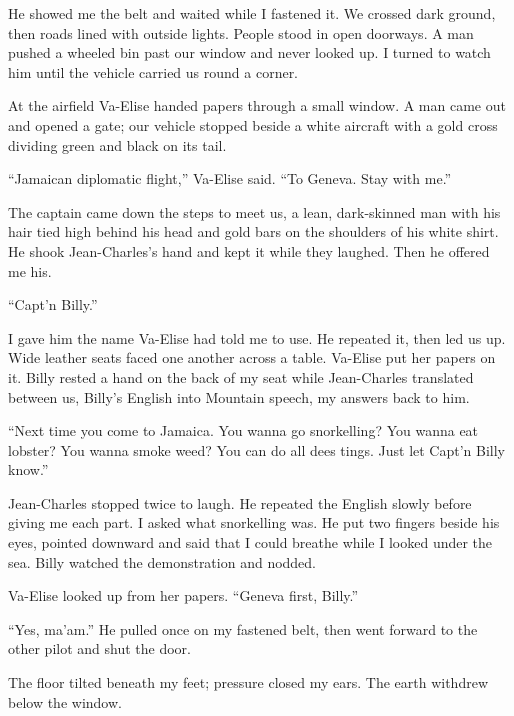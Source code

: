 He showed me the belt and waited while I fastened it. We crossed dark ground, then roads lined with outside lights. People stood in open doorways. A man pushed a wheeled bin past our window and never looked up. I turned to watch him until the vehicle carried us round a corner.\par

At the airfield Va-Elise handed papers through a small window. A man came out and opened a gate; our vehicle stopped beside a white aircraft with a gold cross dividing green and black on its tail.\par

``Jamaican diplomatic flight,'' Va-Elise said. ``To Geneva. Stay with me.''\par

The captain came down the steps to meet us, a lean, dark-skinned man with his hair tied high behind his head and gold bars on the shoulders of his white shirt. He shook Jean-Charles's hand and kept it while they laughed. Then he offered me his.\par

``Capt'n Billy.''\par

I gave him the name Va-Elise had told me to use. He repeated it, then led us up. Wide leather seats faced one another across a table. Va-Elise put her papers on it. Billy rested a hand on the back of my seat while Jean-Charles translated between us, Billy's English into Mountain speech, my answers back to him.\par

``Next time you come to Jamaica. You wanna go snorkelling? You wanna eat lobster? You wanna smoke weed? You can do all dees tings. Just let Capt'n Billy know.''\par

Jean-Charles stopped twice to laugh. He repeated the English slowly before giving me each part. I asked what snorkelling was. He put two fingers beside his eyes, pointed downward and said that I could breathe while I looked under the sea. Billy watched the demonstration and nodded.\par

Va-Elise looked up from her papers. ``Geneva first, Billy.''\par

``Yes, ma'am.'' He pulled once on my fastened belt, then went forward to the other pilot and shut the door.\par

The floor tilted beneath my feet; pressure closed my ears. The earth withdrew below the window.\par

